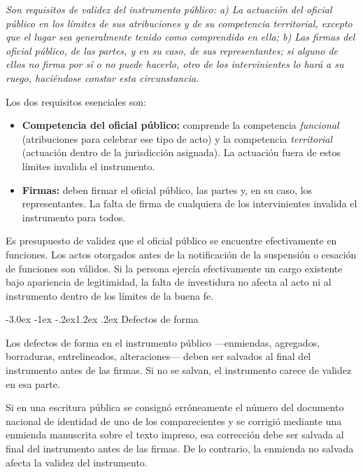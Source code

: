 \documentclass[12pt,oneside]{book}
\makeatletter
\renewcommand\section{\@startsection{section}{1}{\z@}%
  {-3.0ex \@plus -1ex \@minus -.2ex}{1.2ex \@plus .2ex}%
  {\normalfont\large\bfseries\color{acento}}}
\makeatother
\begin{document}
\begin{regla}
\textit{Son requisitos de validez del instrumento público: a) La actuación del oficial público en los límites de sus atribuciones y de su competencia territorial, excepto que el lugar sea generalmente tenido como comprendido en ella; b) Las firmas del oficial público, de las partes, y en su caso, de sus representantes; si alguno de ellos no firma por sí o no puede hacerlo, otro de los intervinientes lo hará a su ruego, haciéndose constar esta circunstancia.}
\end{regla}

Los dos requisitos esenciales son:

\begin{itemize}
    \item \textbf{Competencia del oficial público:} comprende la competencia \emph{funcional} (atribuciones para celebrar ese tipo de acto) y la competencia \emph{territorial} (actuación dentro de la jurisdicción asignada). La actuación fuera de estos límites invalida el instrumento.
    \item \textbf{Firmas:} deben firmar el oficial público, las partes y, en su caso, los representantes. La falta de firma de cualquiera de los intervinientes invalida el instrumento para todos.
\end{itemize}

\begin{importante}
Es presupuesto de validez que el oficial público se encuentre efectivamente en funciones. Los actos otorgados antes de la notificación de la suspensión o cesación de funciones son válidos. Si la persona ejercía efectivamente un cargo existente bajo apariencia de legitimidad, la falta de investidura no afecta al acto ni al instrumento dentro de los límites de la buena fe.
\end{importante}

\section{Defectos de forma}

Los defectos de forma en el instrumento público ---enmiendas, agregados, borraduras, entrelineados, alteraciones--- deben ser salvados al final del instrumento antes de las firmas. Si no se salvan, el instrumento carece de validez en esa parte.

\begin{ejemplo}
Si en una escritura pública se consignó erróneamente el número del documento nacional de identidad de uno de los comparecientes y se corrigió mediante una enmienda manuscrita sobre el texto impreso, esa corrección debe ser salvada al final del instrumento antes de las firmas. De lo contrario, la enmienda no salvada afecta la validez del instrumento.
\end{ejemplo}
\end{document}
